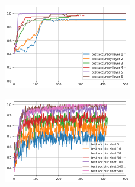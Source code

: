 \documentclass[12pt, a4paper,  nobibnotes]{article}
\begin{document}
\begin{figure}[H]
    \centering
    \includegraphics[width=0.5\textwidth]{figures/test_acc_circles.png}
    \caption{}
    \label{fig:single_layer_regression}
\end{figure}

\begin{figure}[H]
    \centering
    \includegraphics[width=0.5\textwidth]{figures/classifier-test-acc-shots.png}
    \caption{}
    \label{fig:single_layer_regression}
\end{figure}
\end{document}
